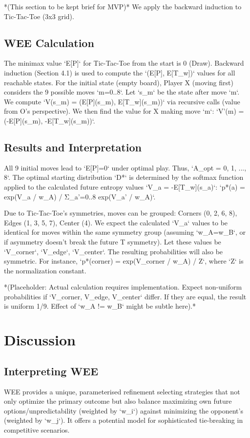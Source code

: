 \documentclass{article}
\begin{document}
*(This section to be kept brief for MVP)*
We apply the backward induction to Tic-Tac-Toe (3x3 grid).
\subsection{WEE Calculation}
The minimax value `E[P]` for Tic-Tac-Toe from the start is 0 (Draw). Backward induction (Section 4.1) is used to compute the `(E[P], E[T_w])` values for all reachable states. For the initial state (empty board), Player X (moving first) considers the 9 possible moves `m=0..8`. Let `s_m` be the state after move `m`. We compute `V(s_m) = (E[P](s_m), E[T_w](s_m))` via recursive calls (value from O's perspective). We then find the value for X making move `m`: `V'(m) = (-E[P](s_m), -E[T_w](s_m))`.

\subsection{Results and Interpretation}
All 9 initial moves lead to `E[P]=0` under optimal play. Thus, `A_opt = {0, 1, ..., 8}`. The optimal starting distribution `D*` is determined by the softmax function applied to the calculated future entropy values `V_a = -E[T_w](s_a)`:
`p*(a) = exp(V_a / w_A) / Σ_{a'=0..8} exp(V_{a'} / w_A)`.

Due to Tic-Tac-Toe's symmetries, moves can be grouped: Corners (0, 2, 6, 8), Edges (1, 3, 5, 7), Center (4). We expect the calculated `V_a` values to be identical for moves within the same symmetry group (assuming `w_A=w_B`, or if asymmetry doesn't break the future T symmetry). Let these values be `V_corner`, `V_edge`, `V_center`. The resulting probabilities will also be symmetric. For instance, `p*(corner) = exp(V_corner / w_A) / Z`, where `Z` is the normalization constant.

*(Placeholder: Actual calculation requires implementation. Expect non-uniform probabilities if `V_corner, V_edge, V_center` differ. If they are equal, the result is uniform 1/9. Effect of `w_A != w_B` might be subtle here).*

\section{Discussion}

\subsection{Interpreting WEE}
WEE provides a unique, parameterised refinement selecting strategies that not only optimize the primary outcome but also balance maximizing own future options/unpredictability (weighted by `w_i`) against minimizing the opponent's (weighted by `w_j`). It offers a potential model for sophisticated tie-breaking in competitive scenarios.
\end{document}
